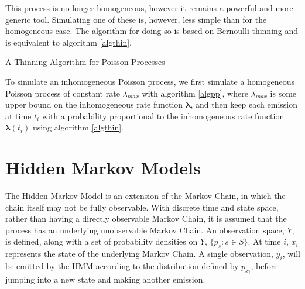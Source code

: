 This process is no longer homogeneous, however it remains a powerful and more generic tool. Simulating one of these is, however, less simple than for the homogeneous case. The algorithm for doing so is based on Bernoulli thinning \cite{thinning} and is equivalent to algorithm \ref{algthin}.

\begin{algorithm}
\SetAlgoLined
{}

\caption{A Thinning Algorithm for Poisson Processes}\label{algthin}

\end{algorithm}

To simulate an inhomogeneous Poisson process, we first simulate a homogeneous Poisson process of constant rate $\lambda_{max}$ with algorithm \ref{algpp}, where $\lambda_{max}$ is some upper bound on the inhomogeneous rate function $\bm{\lambda}$, and then keep each emission at time $t_i$ with a probability proportional to the inhomogeneous rate function $\bm{\lambda}(t_i)$ using algorithm \ref{algthin}.

\section{Hidden Markov Models}

The Hidden Markov Model is an extension of the Markov Chain, in which the chain itself may not be fully observable. With discrete time and state space, rather than having a directly observable Markov Chain, it is assumed that the process has an underlying unobservable Markov Chain. An observation space, $Y$, is defined, along with a set of probability densities on $Y$, $\{p_s : s \in S\}$. At time $i$, $x_i$ represents the state of the underlying Markov Chain. A single observation, $y_i$, will be emitted by the HMM according to the distribution defined by $p_{x_i}$, before jumping into a new state and making another emission.

